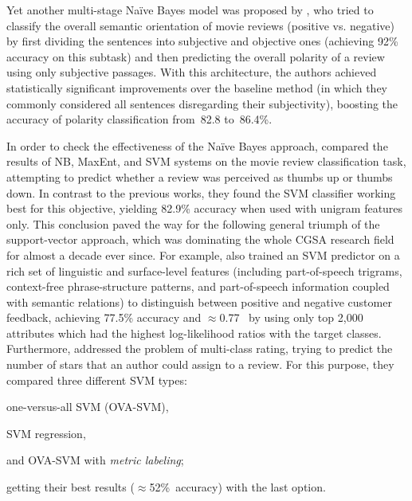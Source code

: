 Yet another multi-stage Na{\"i}ve Bayes model was proposed by
\citet{Pang:04}, who tried to classify the overall semantic
orientation of movie reviews (positive vs. negative) by first dividing
the sentences into subjective and objective ones (achieving 92\%
accuracy on this subtask) and then predicting the overall polarity of
a review using only subjective passages.  With this architecture, the
authors achieved statistically significant improvements over the
baseline method (in which they commonly considered all sentences
disregarding their subjectivity), boosting the accuracy of polarity
classification from~82.8 to~86.4\%.

In order to check the effectiveness of the Na{\"i}ve Bayes approach,
\citet{Pang:02} compared the results of NB, MaxEnt, and SVM systems on
the movie review classification task, attempting to predict whether a
review was perceived as thumbs up or thumbs down.  In contrast to the
previous works, they found the SVM classifier working best for this
objective, yielding 82.9\% accuracy when used with unigram features
only.  This conclusion paved the way for the following general triumph
of the support-vector approach, which was dominating the whole CGSA
research field for almost a decade ever since.  For example,
\citet{Gamon:04} also trained an SVM predictor on a rich set of
linguistic and surface-level features (including part-of-speech
trigrams, context-free phrase-structure patterns, and part-of-speech
information coupled with semantic relations) to distinguish between
positive and negative customer feedback, achieving 77.5\% accuracy and
$\approx$0.77~\F{} by using only top 2,000 attributes which had the
highest log-likelihood ratios with the target
classes.  %
Furthermore, \citet{Pang:05} addressed the problem of multi-class
rating, trying to predict the number of stars that an author could
assign to a review.  For this purpose, they compared three different
SVM types:
\begin{inparaenum}[(i)]
\item one-versus-all SVM (OVA-SVM),
\item SVM regression,
\item and OVA-SVM with \emph{metric labeling};
\end{inparaenum}
getting their best results ($\approx$52\%~accuracy) with the last
option.
